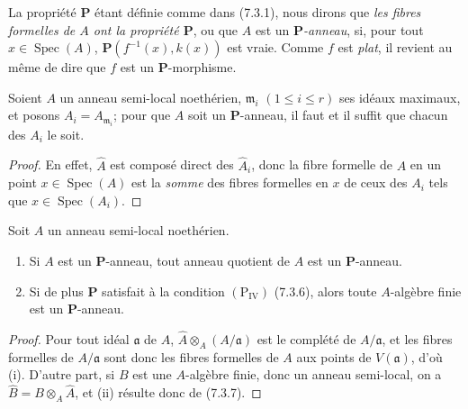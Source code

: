 
La propriété $\boldsymbol P$ étant définie comme dans (7.3.1), nous dirons
que \emph{les fibres formelles de $A$ ont la propriété $\boldsymbol P$},
ou que $A$ est un \emph{$\boldsymbol P$-anneau}, si, pour tout
$x\in\operatorname{Spec}(A)$,
$\boldsymbol P(f^{-1}(x),k(x))$ est vraie. Comme $f$ est \emph{plat}, il
revient au même de dire que $f$ est un $\boldsymbol P$-morphisme.

\begin{proposition}[7.3.14]
\label{IV.2.s7.3.14-fr}
Soient $A$ un anneau semi-local noethérien,
$\mathfrak m_i$ $(1\leqslant i\leqslant r)$ ses idéaux maximaux, et posons
$A_i=A_{\mathfrak m_i}$; pour que $A$ soit un $\boldsymbol P$-anneau, il
faut et il suffit que chacun des $A_i$ le soit.
\end{proposition}

\begin{proof}
En effet, $\widehat A$ est composé direct des $\widehat A_i$, donc la
fibre formelle de $A$ en un point $x\in\operatorname{Spec}(A)$ est la
\emph{somme} des fibres formelles en $x$ de ceux des $A_i$ tels que
$x\in\operatorname{Spec}(A_i)$.
\end{proof}

\begin{proposition}[7.3.15]
\label{IV.2.s7.3.15-fr}
Soit $A$ un anneau semi-local noethérien.
\begin{enumerate}
\item[\emph{i)}] Si $A$ est un $\boldsymbol P$-anneau, tout anneau quotient de $A$
est un $\boldsymbol P$-anneau.
\item[\emph{ii)}] Si de plus $\boldsymbol P$ satisfait à la condition
$(\mathrm P_{\mathrm{IV}})$ (7.3.6), alors toute $A$-algèbre finie est un
$\boldsymbol P$-anneau.
\end{enumerate}
\end{proposition}

\begin{proof}
Pour tout idéal $\mathfrak a$ de $A$,
$\widehat A\otimes_A(A/\mathfrak a)$ est le complété de
$A/\mathfrak a$, et les fibres formelles de $A/\mathfrak a$ sont donc les
fibres formelles de $A$ aux points de $V(\mathfrak a)$, d'où (i). D'autre
part, si $B$ est une $A$-algèbre finie, donc un anneau semi-local, on a
$\widehat B=B\otimes_A\widehat A$, et (ii) résulte donc de (7.3.7).
\end{proof}


